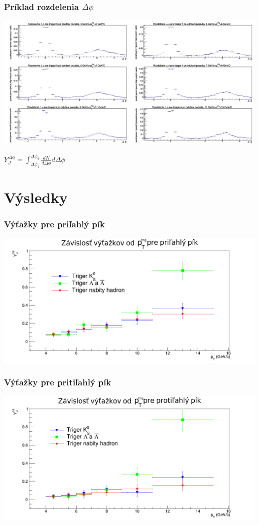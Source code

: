 \documentclass{beamer}
\begin{document}
	\begin{frame}
		\frametitle{Príklad rozdelenia $\Delta \phi$}
		\centering \includegraphics[scale=0.25]{../Obrazky_praca/DeltaPhiHH.png}
		
		$Y_J^{\Delta\phi}=\int_{\Delta \phi_1}^{\Delta \phi_2} \frac{dN}{d\Delta \phi } d\Delta\phi $
	\end{frame}

\section{Výsledky}

	\begin{frame}
		\frametitle{Výťažky pre priľahlý pík}
		\centering \includegraphics[scale=0.35]{../Obrazky_praca/vytazok_near.png}

	\end{frame}

	\begin{frame}
		\frametitle{Výťažky pre pritiľahlý pík}
		\centering \includegraphics[scale=0.35]{../Obrazky_praca/vytazok_away.png}
	
	\end{frame}
\end{document}
